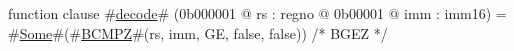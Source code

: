 function clause #\hyperref[zdecode]{decode}# (0b000001 @ rs : regno @ 0b00001 @ imm : imm16) =
  #\hyperref[zSome]{Some}#(#\hyperref[zBCMPZ]{BCMPZ}#(rs, imm, GE, false, false)) /* BGEZ */
